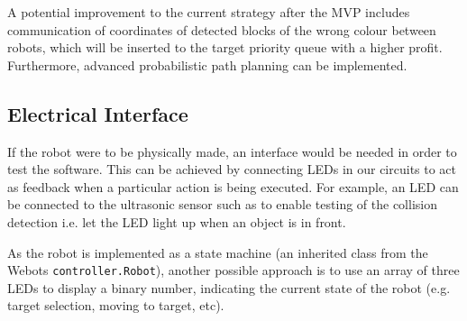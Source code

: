 
A potential improvement to the current strategy after the MVP includes communication of coordinates of detected blocks of the wrong colour between robots, which will be inserted to the target priority queue with a higher profit. Furthermore, advanced probabilistic path planning can be implemented.

\subsection{Electrical Interface}

If the robot were to be physically made, an interface would be needed in order to test the software. This can be achieved by connecting LEDs in our circuits to act as feedback when a particular action is being executed. For example, an LED can be connected to the ultrasonic sensor such as to enable testing of the collision detection i.e. let the LED light up when an object is in front.

As the robot is implemented as a state machine (an inherited class from the Webots \texttt{controller.Robot}), another possible approach is to use an array of three LEDs to display a binary number, indicating the current state of the robot (e.g. target selection, moving to target, etc).


